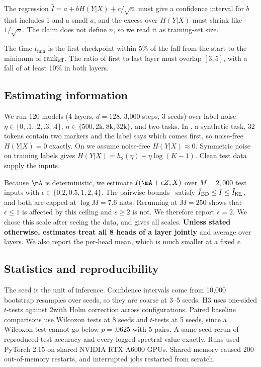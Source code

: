  The regression $\hat I=a+bH(Y|X)+c/\sqrt n$ must give a confidence interval for $b$ that includes 1 and a small $a$, and the excess over $H(Y|X)$ must shrink like $1/\sqrt n$. The claim does not define $n$, so we read it as training-set size.

 The time $t_{\min}$ is the first checkpoint within 5\% of the fall from the start to the minimum of $\mathrm{rank}_{\mathrm{eff}}$. The ratio of first to last layer must overlap $[3,5]$, with a fall of at least 10\% in both layers.

\subsection{Estimating information}

We run 120 models (4 layers, $d=128$, 3,000 steps, 3 seeds) over label noise $\eta\in\{0,.1,.2,.3,.4\}$, $n\in\{500,2\text{k},8\text{k},32\text{k}\}$, and two tasks. In \order, a synthetic task, 32 tokens contain two markers and the label says which comes first, so noise-free $H(Y|X)=0$ exactly. On \agnews we assume noise-free $H(Y|X)\approx0$. Symmetric noise on training labels gives $H(Y|X)=h_2(\eta)+\eta\log(K-1)$. Clean test data supply the inputs.

Because $\mA$ is deterministic, we estimate $I(\mA+\epsilon Z;X)$ over $M=2{,}000$ test inputs with $\epsilon\in\{0.2,0.5,1,2,4\}$. The pairwise bounds~\citep{kolchinsky2017estimating} satisfy $\hat{I}_{\mathrm{BD}}\le I\le\hat{I}_{\mathrm{KL}}$, and both are capped at $\log M=7.6$ nats. Rerunning at $M=250$ shows that $\epsilon\le1$ is affected by this ceiling and $\epsilon\ge2$ is not. We therefore report $\epsilon=2$. We chose this scale after seeing the data, and  gives all scales. {\bf Unless stated otherwise, estimates treat all 8 heads of a layer jointly} and average over layers. We also report the per-head mean, which is much smaller at a fixed $\epsilon$.

\subsection{Statistics and reproducibility}

The seed is the unit of inference. Confidence intervals come from 10,000 bootstrap resamples over seeds, so they are coarse at 3--5 seeds. H3 uses one-sided $t$-tests against 2\pp with Holm correction across configurations. Paired baseline comparisons use Wilcoxon tests at 8 seeds and $t$-tests at 5 seeds, since a Wilcoxon test cannot go below $p=.0625$ with 5 pairs. A same-seed rerun of  reproduced test accuracy and every logged spectral value exactly. Runs used PyTorch 2.15 on shared NVIDIA RTX A6000 GPUs. Shared memory caused 200 out-of-memory restarts, and interrupted jobs restarted from scratch.
